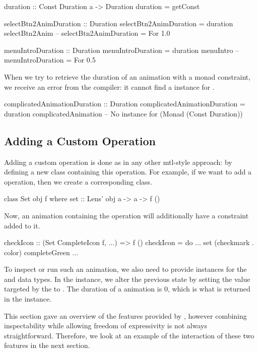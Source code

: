 \begin{code}
duration :: Const Duration a -> Duration
duration = getConst

selectBtn2AnimDuration :: Duration
selectBtn2AnimDuration = duration selectBtn2Anim
-- selectBtn2AnimDuration = For 1.0

menuIntroDuration :: Duration
menuIntroDuration = duration menuIntro
-- menuIntroDuration = For 0.5
\end{code}

When we try to retrieve the duration of an animation with a monad constraint, we receive an error from the compiler: it cannot find a  instance for .

\begin{spec}
complicatedAnimationDuration :: Duration
complicatedAnimationDuration = duration complicatedAnimation
-- No instance for (Monad (Const Duration))
\end{spec}

\subsection{Adding a Custom Operation}

Adding a custom operation is done as in any other mtl-style approach: by defining a new class containing this operation. For example, if we want to add a  operation, then we create a corresponding  class.

\begin{code}
class Set obj f where
  set :: Lens' obj a -> a -> f ()
\end{code}

Now, an animation containing the  operation will additionally have a  constraint added to it.

\begin{code}
checkIcon :: (Set CompleteIcon f, ...) => f ()
checkIcon = do
  ...
  set (checkmark . color) completeGreen
  ...
\end{code}

To inspect or run such an animation, we also need to provide instances for the  and  data types. In the  instance, we alter the previous state by setting the value targeted by the  to . The duration of a  animation is 0, which is what is returned in the  instance.


This section gave an overview of the features provided by \dsl{}, however combining inspectability while allowing freedom of expressivity is not always straightforward. Therefore, we look at an example of the interaction of these two features in the next section.
